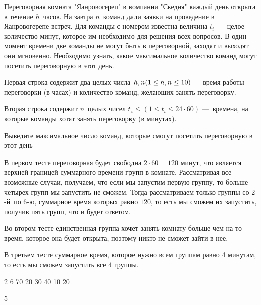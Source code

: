 
Переговорная комната "Яанровогереп" в компании "Скедня" каждый день открыта в течение $h$ часов. На завтра $n$ команд дали заявки на проведение в Яанровогерепе встреч. Для команды с номером  известна величина $t_i$ — целое количество минут, которое им необходимо для решения всех вопросов. В один момент времени две команды не могут быть в переговорной, заходят и выходят они мгновенно. Необходимо узнать, какое максимальное количество команд могут посетить переговорную в этот день.


Первая строка содержит два целых числа $h, n\space(1\leq h, n\leq 10)$ — время работы переговорки (в часах) и количество команд, желающих занять переговорку.

Вторая строка содержит $n$ целых чисел $t_i\leq(1\leq t_i\leq 24\cdot 60)$ — времена, на которые команды хотят занять переговорку (в минутах).

\outputfmtSection

Выведите максимальное число команд, которые смогут посетить переговорную в этот день

\explanationSection

В первом тесте переговорная будет свободна $2\cdot 60=120$ минут, что является верхней границей суммарного времени групп в комнате. Рассматривая все возможные случаи, получаем, что если мы запустим первую группу, то больше четырех групп мы запустить не сможем. Тогда рассматриваем только группы со $2$-й по $6$-ю, суммарное время которых равно $120$, то есть мы сможем их запустить, получив пять групп, что и будет ответом.

Во втором тесте единственная группа хочет занять комнату больше чем на то время, которое она будет открыта, поэтому никто не сможет зайти в нее.

В третьем тесте суммарное время, которое нужно всем группам равно 4 минутам, то есть мы сможем запустить все 4 группы.


\begin{myverbbox}[\small]{\vinput}
    2 6
    70 20 30 40 10 20
\end{myverbbox}

\begin{myverbbox}[\small]{\voutput}
    5
\end{myverbbox}


